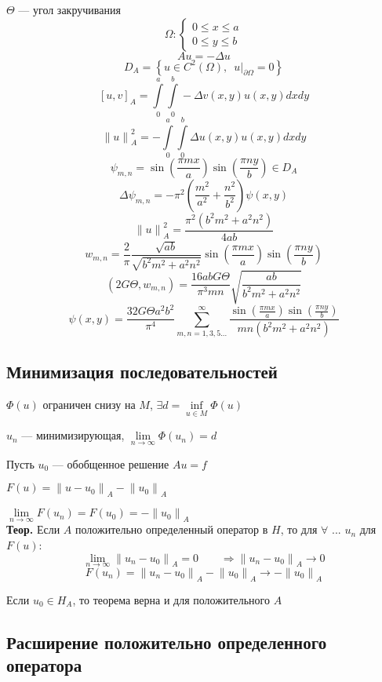 \documentclass[12pt, a4paper]{article}
\newcommand{\Int}{\int\limits}
\newcommand{\Sum}{\sum\limits}
\begin{document}
$\Theta$ --- угол закручивания
\[ \Omega: \left\{ \begin{array}{l}
	0 \leq x \leq a  \\
	0 \leq y \leq b  
\end{array} \right. \]
\[ Au = -\Delta u \]
\[ D_A = \left\{ u \in C^2(\Omega), \enspace \left. u \right|_{\partial \Omega} = 0 \right\} \]
\[ {[u,v]}_A = \Int_{0}^{a} \Int_{0}^{b} -\Delta v(x,y)u(x,y)dxdy \]
\[ {\| u \|}^2_A = - \Int_{0}^{a} \Int_{0}^{b} \Delta u(x,y)u(x,y)dxdy \]
\[ \psi_{m,n} = \sin \left( \frac{\pi m x}{a} \right) \sin \left( \frac{\pi n y}{b} \right) \in D_A \]
\[ \Delta \psi_{m,n} = - \pi^2 \left( \frac{m^2}{a^2} + \frac{n^2}{b^2} \right) \psi (x, y) \]
\[ {\| u \|}^2_A = \frac{\pi^2 (b^2 m^2 + a^2 n^2)}{4ab} \]
\[ w_{m,n} = \frac{2}{\pi} \frac{\sqrt{ab}}{\sqrt{b^2 m^2 + a^2 n^2}} \sin \left( \frac{\pi m x}{a} \right) \sin \left( \frac{\pi n y}{b} \right) \]
\[ (2G\Theta, w_{m,n}) = \frac{16abG\Theta}{\pi^3 m n} \sqrt{\frac{ab}{b^2 m^2 + a^2 n^2}} \]
\[ \psi(x,y) = \frac{32G\Theta a^2b^2}{\pi^4} \Sum_{m,n=1,3,5...}^{\infty} \frac{\sin \left( \frac{\pi m x}{a} \right) \sin \left( \frac{\pi n y}{b} \right)}{mn (b^2 m^2 + a^2 n^2)} \]

\subsection{Минимизация последовательностей}

$ \Phi(u) $ ограничен снизу на $M$, \quad $\exists d = \underset{u \in M}{\inf} \Phi(u)$

$ {u_n}$ --- минимизирующая, \quad $ \underset{n \rightarrow \infty}{\lim} \Phi(u_n) = d $

Пусть $u_0$ --- обобщенное решение $Au = f$

$ F(u) = {\| u - u_0 \|}_A - {\| u_0 \|}_A $

$ \underset{n \rightarrow \infty}{\lim} F(u_n) = F(u_0) = - {\| u_0 \|}_A $ \\

\textbf{Теор.} Если $A$ положительно определенный оператор в $H$, то для $\forall$ ... ${u_n}$ для $F(u)$:
\[ \underset{n \rightarrow \infty}{\lim} {\| u_n - u_0 \|}_A = 0 \qquad \Rightarrow {\| u_n - u_0 \|}_A \rightarrow 0 \]
\[ F(u_n) = {\| u_n - u_0 \|}_A - {\| u_0 \|}_A \rightarrow -{\| u_0 \|}_A \]

Если $u_0 \in H_A$, то теорема верна и для положительного $A$

\subsection{Расширение положительно определенного оператора}
\end{document}
